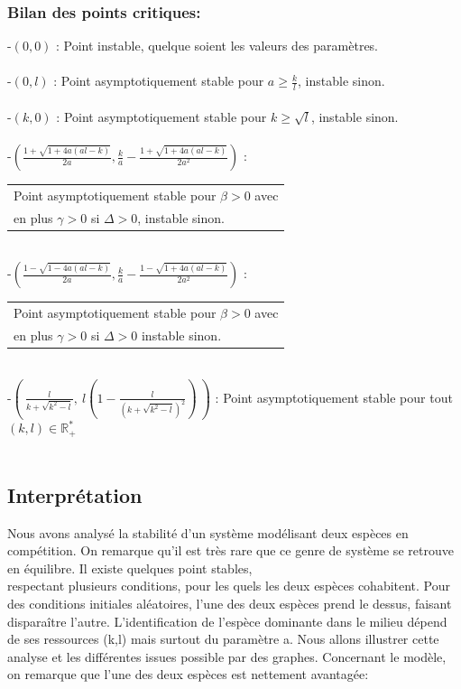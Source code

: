 \documentclass{article}
\begin{document}
\subsubsection{Bilan des points critiques: }
\noindent
-$(0,0)$ : Point instable, quelque soient les valeurs des paramètres. \\\\
-$(0,l)$ : Point asymptotiquement stable pour $ a \geqslant \frac{k}{l} $, instable sinon.\\\\
-$(k,0)$ : Point asymptotiquement stable pour $ k \geqslant \sqrt{l} $, instable sinon. \\\\
-$\left(\frac{1 + \sqrt{1 + 4a(al -k)}}{2a}, \frac{k}{a} - \frac{1 + \sqrt{1 + 4a(al -k)}}{2a^2} \right)$ : 
\begin{tabular}{l}
    Point asymptotiquement stable pour $\beta > 0$ avec \\
    en plus $\gamma > 0$ si $\Delta > 0$, instable sinon.
\end{tabular}\\
-$\left(\frac{1  - \sqrt{1 - 4a(al -k)}}{2a}, \frac{k}{a} - \frac{1 - \sqrt{1 + 4a(al -k)}}{2a^2} \right)$ :
\begin{tabular}{l}
    Point asymptotiquement stable pour $\beta > 0$ avec \\ en plus $\gamma > 0$ si $\Delta >0$ instable sinon.
\end{tabular}\\
-$\left(\ \frac{l}{k + \sqrt{k^2 - l}},\ l\left(1 - \frac{l}{(k + \sqrt{k^2 - l})^2} \right)\ \right)$ : Point asymptotiquement stable pour tout $(k,l) \in \mathbb{R}_+^*$\\\\
\newpage
\subsection*{Interprétation}

Nous avons analysé la stabilité d'un système modélisant deux espèces en compétition. On remarque qu'il est très rare que ce genre de système se retrouve en équilibre. Il existe quelques point stables,\\respectant plusieurs conditions, pour les quels les deux espèces cohabitent. Pour des conditions initiales aléatoires, l'une des deux espèces prend le dessus, faisant disparaître l'autre. L'identification de l'espèce dominante dans le milieu dépend de ses ressources (k,l) mais surtout du paramètre a. Nous allons illustrer cette analyse et les différentes issues possible par des graphes. Concernant le modèle, on remarque que l'une des deux espèces est nettement avantagée: 
\end{document}
